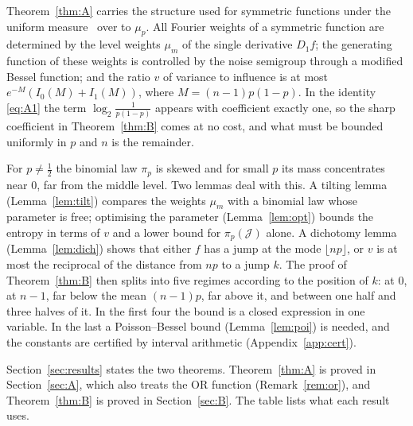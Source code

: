 \documentclass[11pt]{amsart}
\theoremstyle{remark}
\newcommand{\J}{\mathcal{J}}
\begin{document}
Theorem~\ref{thm:A} carries the structure used for symmetric functions under the uniform measure~\cite{Shm26sym} over to $\mu_p$. All Fourier weights of a symmetric function are determined by the level weights $\mu_m$ of the single derivative $D_1 f$; the generating function of these weights is controlled by the noise semigroup through a modified Bessel function; and the ratio $v$ of variance to influence is at most $e^{-M}(I_0(M) + I_1(M))$, where $M = (n-1)p(1-p)$. In the identity \eqref{eq:A1} the term $\log_2\frac{1}{p(1-p)}$ appears with coefficient exactly one, so the sharp coefficient in Theorem~\ref{thm:B} comes at no cost, and what must be bounded uniformly in $p$ and $n$ is the remainder.

For $p \ne \frac12$ the binomial law $\pi_p$ is skewed and for small $p$ its mass concentrates near $0$, far from the middle level. Two lemmas deal with this. A tilting lemma (Lemma~\ref{lem:tilt}) compares the weights $\mu_m$ with a binomial law whose parameter is free; optimising the parameter (Lemma~\ref{lem:opt}) bounds the entropy in terms of $v$ and a lower bound for $\pi_p(\J)$ alone. A dichotomy lemma (Lemma~\ref{lem:dich}) shows that either $f$ has a jump at the mode $\lfloor np \rfloor$, or $v$ is at most the reciprocal of the distance from $np$ to a jump $k$. The proof of Theorem~\ref{thm:B} then splits into five regimes according to the position of $k$: at $0$, at $n - 1$, far below the mean $(n-1)p$, far above it, and between one half and three halves of it. In the first four the bound is a closed expression in one variable. In the last a Poisson--Bessel bound (Lemma~\ref{lem:poi}) is needed, and the constants are certified by interval arithmetic (Appendix~\ref{app:cert}).

Section~\ref{sec:results} states the two theorems. Theorem~\ref{thm:A} is proved in Section~\ref{sec:A}, which also treats the OR function (Remark~\ref{rem:or}), and Theorem~\ref{thm:B} is proved in Section~\ref{sec:B}. The table lists what each result uses.
\end{document}
